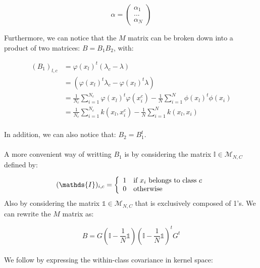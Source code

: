 \begin{equation*}
\alpha = \left( \begin{array}{c}
                                \alpha_1 \\
                                ... \\
                                \alpha_N
                  \end{array}  \right) 
\end{equation*}

Furthermore, we can notice that the $M$ matrix can be broken down into a product of two matrices: $B = B_1B_2$, with:

\begin{align*}
(B_1)_{l, c} &= \varphi(x_l)^t(\lambda_c - \lambda)\\
             &= (\varphi(x_l)^t\lambda_c -\varphi(x_l)^t\lambda) \\
             &= \frac{1}{N_c} \sum_{i=1}^{N_c} \varphi(x_l)^t\varphi(x_i^c) -
                 \frac{1}{N}\sum_{i=1}^N\phi(x_l)^t\phi(x_i) \\
             &= \frac{1}{N_c} \sum_{i = 1}^{N_c} k(x_l, x_i^c) -
                \frac{1}{N}\sum_{i=1}^N k(x_l, x_i)\\
\end{align*}

In addition, we can also notice that: $B_2 = B_1^t$.

\paragraph{}
A more convenient way of writting $B_1$ is by considering the matrix $\mathds{I} \in
\mathcal{M}_{N,C}$ defined by:

$$ (\mathds{I})_{i, c} = \left\{ \begin{array}{ll}
                                  1 & \textnormal{if $x_i$ belongs to class $c$} \\
                                  0 & \textnormal{otherwise}
                               \end{array}
                        \right.$$
Also by considering the matrix $\mathds{1} \in \mathcal{M}_{N,C}$ that is exclusively composed of
1's.
We can rewrite the $M$ matrix as:

$$B = G\left( \mathds{I} - \frac{1}{N} \mathds{1} \right)\left( \mathds{I} - \frac{1}{N} \mathds{1}\right)^tG^t$$

\paragraph{}
We follow by expressing the within-class covariance in kernel space:

